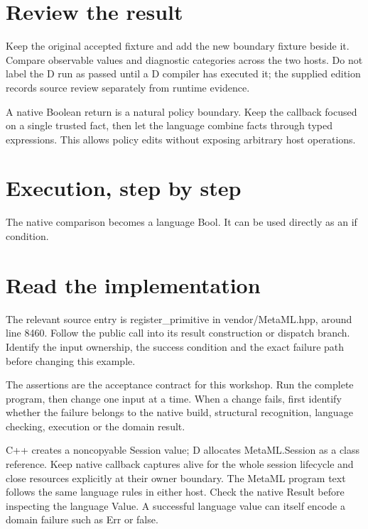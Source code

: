 \section*{Review the result}
Keep the original accepted fixture and add the new boundary fixture beside it. Compare observable values and diagnostic categories across the two hosts. Do not label the D run as passed until a D compiler has executed it; the supplied edition records source review separately from runtime evidence.

\clearpage
{}
A native Boolean return is a natural policy boundary. Keep the callback focused on a single trusted fact, then let the language combine facts through typed expressions. This allows policy edits without exposing arbitrary host operations.


\section*{Execution, step by step}
The native comparison becomes a language Bool. It can be used directly as an if condition.

\section*{Read the implementation}
The relevant source entry is register\_primitive in vendor/MetaML.hpp, around line 8460. Follow the public call into its result construction or dispatch branch. Identify the input ownership, the success condition and the exact failure path before changing this example.

The assertions are the acceptance contract for this workshop. Run the complete program, then change one input at a time. When a change fails, first identify whether the failure belongs to the native build, structural recognition, language checking, execution or the domain result.

\clearpage
{}
C++ creates a noncopyable Session value; D allocates MetaML.Session as a class reference. Keep native callback captures alive for the whole session lifecycle and close resources explicitly at their owner boundary. The MetaML program text follows the same language rules in either host. Check the native Result before inspecting the language Value. A successful language value can itself encode a domain failure such as Err or false.

